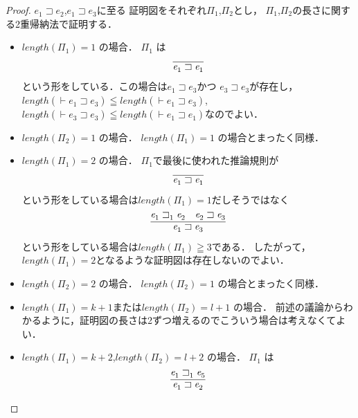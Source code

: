 \documentclass{ltjsbook}%
\begin{document}
\begin{proof}%
  $\mathit{e}_1^{}\sqsupset\mathit{e}_2^{}$,$\mathit{e}_1^{}\sqsupset\mathit{e}_3^{}$に至る%
  証明図をそれぞれ$\Pi_1^{}$,$\Pi_2^{}$とし，%
  $\Pi_1^{}$,$\Pi_2^{}$の長さに関する2重帰納法で証明する．%
  \begin{itemize}%
  \item $length(\Pi_1^{})=1$ の場合．%
    $\Pi_1^{}$ は%
    \begin{equation}%
      \infer{%
        \mathit{e}_1^{}\sqsupset\mathit{e}_1^{}%
      }{%
      }%
    \end{equation}%
    という形をしている．この場合は$\mathit{e}_1^{}\sqsupset\mathit{e}_3^{}$かつ%
    $\mathit{e}_3^{}\sqsupset\mathit{e}_3^{}$が存在し，%
    $length(\vdash\mathit{e}_1^{}\sqsupset\mathit{e}_3^{})\leqq%
    length(\vdash\mathit{e}_1^{}\sqsupset\mathit{e}_3^{})$,%
    $length(\vdash\mathit{e}_3^{}\sqsupset\mathit{e}_3^{})\leqq%
    length(\vdash\mathit{e}_1^{}\sqsupset\mathit{e}_1^{})$なのでよい．%
  \item $length(\Pi_2^{})=1$ の場合．%
    $length(\Pi_1^{})=1$ の場合とまったく同様．%
  \item $length(\Pi_1^{})=2$ の場合．%
    $\Pi_1^{}$で最後に使われた推論規則が%
    \begin{equation}%
      \infer{%
        \mathit{e}_1^{}\sqsupset\mathit{e}_1^{}%
      }{%
      }%
    \end{equation}%
    という形をしている場合は$length(\Pi_1^{})=1$だしそうではなく%
    \begin{equation}%
      \infer{%
        \mathit{e}_1^{}\sqsupset\mathit{e}_3^{}%
      }{%
        \mathit{e}_1^{}\sqsupset_1^{}\mathit{e}_2^{}%
      &%
        \mathit{e}_2^{}\sqsupset\mathit{e}_3^{}%
      }%
    \end{equation}%
    という形をしている場合は$length(\Pi_1^{})\geqq 3$である．%
    したがって，$length(\Pi_1^{})=2$となるような証明図は存在しないのでよい．%
  \item $length(\Pi_2^{})=2$ の場合．%
    $length(\Pi_2^{})=1$ の場合とまったく同様．%
  \item $length(\Pi_1^{})=k+1$または$length(\Pi_2^{})=l+1$ の場合．%
    前述の議論からわかるように，証明図の長さは2ずつ増えるのでこういう場合は考えなくてよい．%
  \item $length(\Pi_1^{})=k+2$,$length(\Pi_2^{})=l+2$ の場合．%
    $\Pi_1^{}$ は%
    \begin{equation}%
      \infer{%
        \mathit{e}_1^{}\sqsupset\mathit{e}_2^{}%
      }{%
        \mathit{e}_1^{}\sqsupset_1^{}\mathit{e}_5^{}%
}
\end{equation}
\end{itemize}
\end{proof}
\end{document}
